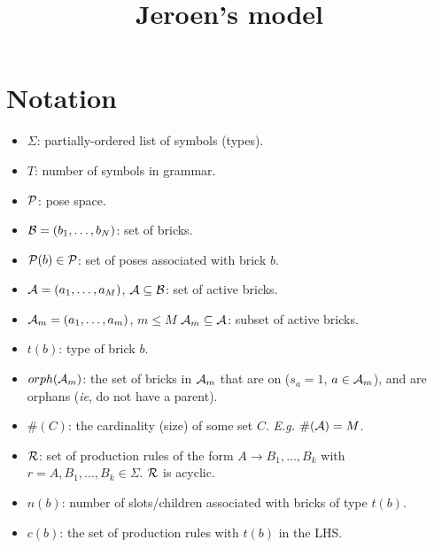 \documentclass[11pt]{article}
\newcommand{\Pose}{{\cal P}}
\newcommand{\A}{{\cal A}}
\newcommand{\symb}{\Sigma}
\newcommand{\B}{\cal B}
\newcommand{\Am}{\A_{m}}
\begin{document}
\title{Jeroen's model}
\maketitle

\section{Notation}

\begin{itemize}

\item $\symb$: partially-ordered list of symbols (types).


\item $T$: number of symbols in grammar.

\item $\Pose$: pose space.

\item ${\B} = (b_1,\ldots,b_N)$: set of bricks.

\item $\Pose(b) \in \Pose$: set of poses associated with brick $b$.

\item $\A = (a_1,\ldots,a_M)$, $\A \subseteq {\B}$: set of active bricks.

\item $\Am = (a_1,\ldots,a_m)$, $m \leq M$ $\Am \subseteq {\A}$: subset of active bricks.

\item $t(b)$: type of brick $b$.

\item $orph(\Am)$: the set of bricks in $\Am$ that are on ($s_a = 1$, $a \in \Am$), and are orphans (\emph{ie}, do not have a parent).

\item $\#(C)$: the cardinality (size) of some set $C$. \emph{E.g.} $\#(\A)=M$.

\item ${\cal R}$: set of production rules of the form
$A \rightarrow B_1,\ldots,B_k$ with $r = A,B_1,\ldots,B_k \in \Sigma$. ${\cal R}$ is acyclic.

\item $n(b)$: number of slots/children associated with bricks of type $t(b)$.

\item $c(b)$: the set of production rules with $t(b)$ in the LHS.


\end{itemize}
\end{document}
